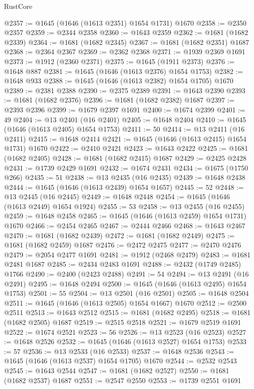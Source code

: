 \begin{lexlean}{RustCore}
\begin{coremodule}
@2357 := @1645 (@1646 (@1613 @2351) @1654 @1731) @1670
@2358 := @2350 @2357
@2359 := @2344 @2358
@2360 := @1643 @2359
@2362 := @1681 (@1682 @2339)
@2364 := @1681 (@1682 @2345)
@2367 := @1681 (@1682 @2351) @1687
@2368 := @2364 @2367
@2369 := @2362 @2368
@2371 := @1939 @2369 @1691
@2373 := @1912 (@2360 @2371)
@2375 := @1645 (@1911 @2373)
@2376 := @1648 @887
@2381 := @1645 (@1646 (@1613 @2376) @1654 @1753)
@2382 := @1648 @933
@2388 := @1645 (@1646 (@1613 @2382) @1654 @1705) @1670
@2389 := @2381 @2388
@2390 := @2375 @2389
@2391 := @1643 @2390
@2393 := @1681 (@1682 @2376)
@2396 := @1681 (@1682 @2382) @1687
@2397 := @2393 @2396
@2399 := @1679 @2397 @1691
@2400 := @1674 @2399
@2401 := 49
@2404 := @13 @2401 (@16 @2401)
@2405 := @1648 @2404
@2410 := @1645 (@1646 (@1613 @2405) @1654 @1753)
@2411 := 50
@2414 := @13 @2411 (@16 @2411)
@2415 := @1648 @2414
@2421 := @1645 (@1646 (@1613 @2415) @1654 @1731) @1670
@2422 := @2410 @2421
@2423 := @1643 @2422
@2425 := @1681 (@1682 @2405)
@2428 := @1681 (@1682 @2415) @1687
@2429 := @2425 @2428
@2431 := @1739 @2429 @1691
@2432 := @1674 @2431
@2434 := @1675 (@1750 @266)
@2435 := 51
@2438 := @13 @2435 (@16 @2435)
@2439 := @1648 @2438
@2444 := @1645 (@1646 (@1613 @2439) @1654 @1657)
@2445 := 52
@2448 := @13 @2445 (@16 @2445)
@2449 := @1648 @2448
@2454 := @1645 (@1646 (@1613 @2449) @1654 @1924)
@2455 := 53
@2458 := @13 @2455 (@16 @2455)
@2459 := @1648 @2458
@2465 := @1645 (@1646 (@1613 @2459) @1654 @1731) @1670
@2466 := @2454 @2465
@2467 := @2444 @2466
@2468 := @1643 @2467
@2470 := @1681 (@1682 @2439)
@2472 := @1681 (@1682 @2449)
@2475 := @1681 (@1682 @2459) @1687
@2476 := @2472 @2475
@2477 := @2470 @2476
@2479 := @2054 @2477 @1691
@2481 := @1912 (@2468 @2479)
@2483 := @1681 @2481 @1687
@2485 := @2434 @2483 @1691
@2488 := @2432 (@1749 @2485) @1766
@2490 := @2400 (@2423 @2488)
@2491 := 54
@2494 := @13 @2491 (@16 @2491)
@2495 := @1648 @2494
@2500 := @1645 (@1646 (@1613 @2495) @1654 @1753)
@2501 := 55
@2504 := @13 @2501 (@16 @2501)
@2505 := @1648 @2504
@2511 := @1645 (@1646 (@1613 @2505) @1654 @1667) @1670
@2512 := @2500 @2511
@2513 := @1643 @2512
@2515 := @1681 (@1682 @2495)
@2518 := @1681 (@1682 @2505) @1687
@2519 := @2515 @2518
@2521 := @1679 @2519 @1691
@2522 := @1674 @2521
@2523 := 56
@2526 := @13 @2523 (@16 @2523)
@2527 := @1648 @2526
@2532 := @1645 (@1646 (@1613 @2527) @1654 @1753)
@2533 := 57
@2536 := @13 @2533 (@16 @2533)
@2537 := @1648 @2536
@2543 := @1645 (@1646 (@1613 @2537) @1654 @1705) @1670
@2544 := @2532 @2543
@2545 := @1643 @2544
@2547 := @1681 (@1682 @2527)
@2550 := @1681 (@1682 @2537) @1687
@2551 := @2547 @2550
@2553 := @1739 @2551 @1691

\end{coremodule}
\end{lexlean}
